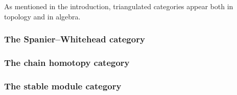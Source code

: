 As mentioned in the introduction, triangulated categories appear both in topology and in algebra.

\subsubsection{The Spanier--Whitehead category}


\subsubsection{The chain homotopy category}


\subsubsection{The stable module category}
